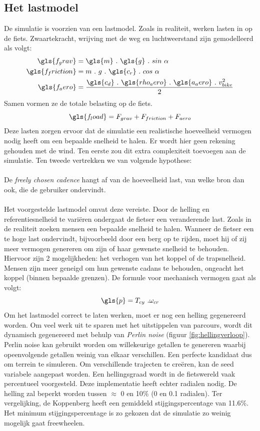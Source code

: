 \subsection*{Het lastmodel}
De simulatie is voorzien van een lastmodel. Zoals in realiteit, werken lasten in op de fiets. Zwaartekracht, wrijving met de weg en luchtweerstand zijn gemodelleerd als volgt:
\\
\begin{align*}
\gls{f_grav}&=\gls{m} \ . \ \gls{g} \ . \ sin \ \alpha \\
\gls{f_friction}&=m \ . \ g \ . \ \gls{c_r} \ . \ cos \ \alpha \\
\gls{f_aero}&=\frac{\gls{c_d} \ . \ \gls{rho_aero} \ . \ \gls{a_aero} \ . \ v_{bike}^2}{2}
\end{align*}
Samen vormen ze de totale belasting op de fiets.
\[\gls{f_load} = F_{grav}+F_{friction}+F_{aero}\]
Deze lasten zorgen ervoor dat de simulatie een realistische hoeveelheid vermogen nodig heeft om een bepaalde snelheid te halen. Er wordt hier geen rekening gehouden met de wind. Ten eerste zou dit extra complexiteit toevoegen aan de simulatie. Ten tweede vertrekken we van volgende hypothese:
\\\\
\tab De \textit{freely chosen cadence} hangt af van de hoeveelheid last, van welke bron dan \tab ook, die de gebruiker ondervindt.
\\\\
Het voorgestelde lastmodel omvat deze vereiste. Door de helling en referentiesnelheid te variëren ondergaat de fietser een veranderende last. Zoals in de realiteit zoeken mensen een bepaalde snelheid te halen. Wanneer de fietser een te hoge last ondervindt, bijvoorbeeld door een berg op te rijden, moet hij of zij meer vermogen genereren om zijn of haar gewenste snelheid te behouden. Hiervoor zijn 2 mogelijkheden: het verhogen van het koppel of de trapsnelheid. Mensen zijn meer geneigd om hun gewenste cadans te behouden, ongeacht het koppel (binnen bepaalde grenzen). De formule voor mechanisch vermogen gaat als volgt:
\[\gls{p}=T_{cy} \ . \omega_{cr} \]
Om het lastmodel correct te laten werken, moet er nog een helling gegenereerd worden. Om veel werk uit te sparen met het uitstippelen van parcours, wordt dit dynamisch gegenereerd met behulp van \textit{Perlin noise} (figuur \ref{fig:hellingverloop}). Perlin noise kan gebruikt worden om willekeurige getallen te genereren waarbij opeenvolgende getallen weinig van elkaar verschillen. Een perfecte kandidaat dus om terrein te simuleren. Om verschillende trajecten te creëren, kan de seed variabele aangepast worden. Een hellingsgraad wordt in de fietswereld vaak percentueel voorgesteld. Deze implementatie heeft echter radialen nodig. De helling zal beperkt worden tussen $\approx$ 0 en 10\% (0 en 0.1 radialen). Ter vergelijking, de Koppenberg heeft een gemiddeld stijgingspercentage van 11.6\%. Het minimum stijgingspercentage is zo gekozen dat de simulatie zo weinig mogelijk gaat freewheelen.
